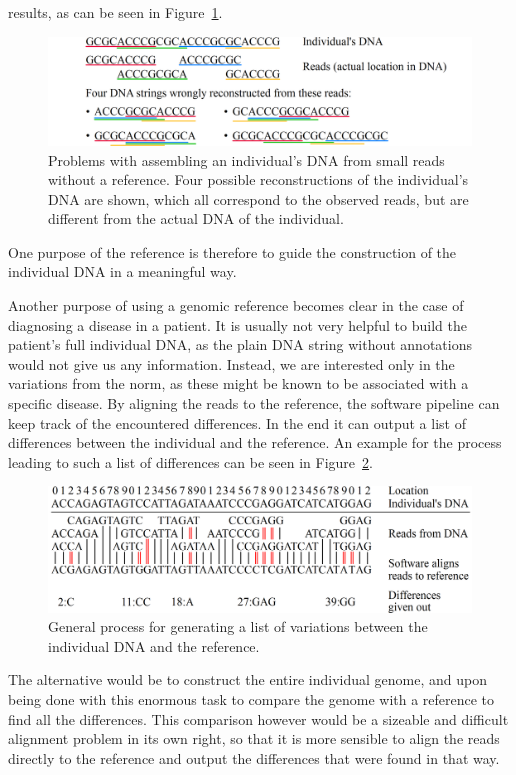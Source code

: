\documentclass[a4paper,12pt,twoside,BCOR=10mm]{scrbook}
\begin{document}
results, as can be seen in Figure~\ref{fig:evo_intro_assembly_wo_reference}.
\begin{figure}[!htb]
\centering
\includegraphics[width=\textwidth]{evo_intro_assembly_wo_reference.png}
\caption[Assembling an individual's DNA from small reads without a reference]{Problems with assembling an individual's DNA from small reads without a reference. Four possible reconstructions of the individual's DNA are shown, which all correspond to the observed reads, but are different from the actual DNA of the individual.} \label{fig:evo_intro_assembly_wo_reference}
\end{figure}
One purpose of the reference is therefore to guide the construction of the individual DNA in a meaningful way.

Another purpose of using a genomic reference becomes clear
in the case of diagnosing a disease in a patient.
It is usually not very helpful to build the patient's full individual DNA, as the plain DNA string without
annotations would not give us any information.
Instead, we are interested only in the variations from the norm,
as these might be known to be associated with a specific disease.
By aligning the reads to the reference, the software pipeline can keep track
of the encountered differences. In the end it can output a list of differences between the individual and the reference.
An example for the process leading to such a list of differences
can be seen in Figure~\ref{fig:evo_intro_general_variation_calling_process}.
\begin{figure}[!htb]
\centering
\includegraphics[width=\textwidth]{evo_intro_general_variation_calling_process.png}
\caption[General variation calling process]{General process for generating a list of variations between the individual DNA and the reference.} \label{fig:evo_intro_general_variation_calling_process}
\end{figure}
The alternative would be to construct the entire individual genome, and upon being done with this enormous task to
compare the genome with a reference to find all the differences. This comparison however would be a sizeable
and difficult alignment problem in its own right, so that it is more sensible to align the reads directly to the reference
and output the differences that were found in that way.
\end{document}
